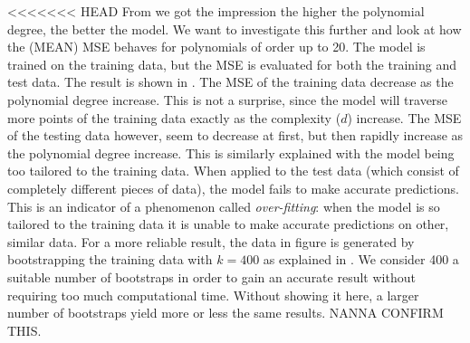 <<<<<<< HEAD
            From  we got the impression the higher the polynomial degree, the better the model. We want to investigate this further and look at how the (MEAN) MSE behaves for polynomials of order up to 20. The model is trained on the training data, but the MSE is evaluated for both the training and test data. The result is shown in . The MSE of the training data decrease as the polynomial degree increase. This is not a surprise, since the model will traverse more points of the training data exactly as the complexity ($d$) increase. The MSE of the testing data however, seem to decrease at first, but then rapidly increase as the polynomial degree increase. This is similarly explained with the model being too tailored to the training data. When applied to the test data (which consist of completely different pieces of data), the model fails to make accurate predictions. This is an indicator of a phenomenon called \textit{over-fitting}: when the model is so tailored to the training data it is unable to make accurate predictions on other, similar data. For a more reliable result, the data in figure  is generated by bootstrapping the training data with $k=400$ as explained in . We consider 400 a suitable number of bootstraps in order to gain an accurate result without requiring too much computational time. Without showing it here, a larger number of bootstraps yield more or less the same results. NANNA CONFIRM THIS. 

